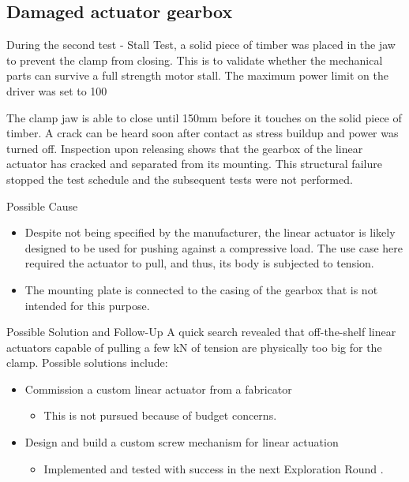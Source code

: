 \subsection{Damaged actuator gearbox}
\label{subsection:exploration_1_damaged_actuator_gearbox}

During the second test - Stall Test, a solid piece of timber was placed in the jaw to prevent the clamp from closing. This is to validate whether the mechanical parts can survive a full strength motor stall. The maximum power limit on the driver was set to 100%

The clamp jaw is able to close until 150mm before it touches on the solid piece of timber. A crack can be heard soon after contact as stress buildup and power was turned off. Inspection upon releasing shows that the gearbox of the linear actuator has cracked and separated from its mounting. This structural failure stopped the test schedule and the subsequent tests were not performed.

Possible Cause
\begin{itemize}
    \item Despite not being specified by the manufacturer, the linear actuator is likely designed to be used for pushing against a compressive load. The use case here required the actuator to pull, and thus, its body is subjected to tension. 
    \item The mounting plate is connected to the casing of the gearbox that is not intended for this purpose.
\end{itemize}

    Possible Solution and Follow-Up
A quick search revealed that off-the-shelf linear actuators capable of pulling a few kN of tension are physically too big for the clamp. Possible solutions include:
\begin{itemize}
    \item Commission a custom linear actuator from a fabricator
    \begin{itemize}
        \item This is not pursued because of budget concerns.
    \end{itemize}
    \item Design and build a custom screw mechanism for linear actuation
    \begin{itemize}
        \item Implemented and tested with success in the next Exploration Round . 
    \end{itemize}
\end{itemize}

